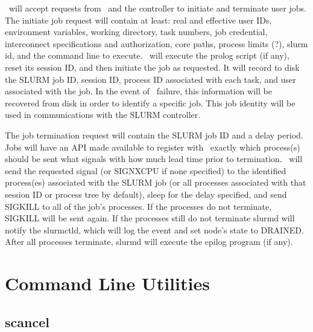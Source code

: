
\slurmd\ will accept requests from \srun\ and the controller to initiate
and terminate user jobs. The initiate job request will contain at least: 
real and effective user IDs, environment variables, working directory, task
numbers, job credential, interconnect specifications and authorization,
core paths, process limits (?), slurm id, and the command line to execute. 
\slurmd\ will execute the prolog script (if any), reset its
session ID, and then initiate the job as requested. It will record to
disk the SLURM job ID, session ID, process ID associated with each task,
and user associated with the job.  In the event of \slurmd\ failure,
this information will be recovered from disk in order to identify a
specific job. This  job identity will be used in communications with
the SLURM controller.


The job termination request will contain the SLURM job ID and a delay
period.  Jobs will have an API made available to register with \slurmd\
exactly which process(s) should be sent what signals with how much lead
time prior to termination.  \slurmd\ will send the requested signal (or
SIGNXCPU if none specified) to the identified process(es) associated with
the SLURM job (or all processes associated with that session ID or process
tree by default), sleep for the delay specified, and send SIGKILL to all
of the job's processes.  If the processes do not terminate, SIGKILL will
be sent again.  If the processes still do not terminate slurmd will notify
the slurmctld, which will log the event and set node's state to DRAINED.
After all processes terminate, slurmd will execute the epilog program
(if any).

\section{Command Line Utilities}

\subsection{scancel}

